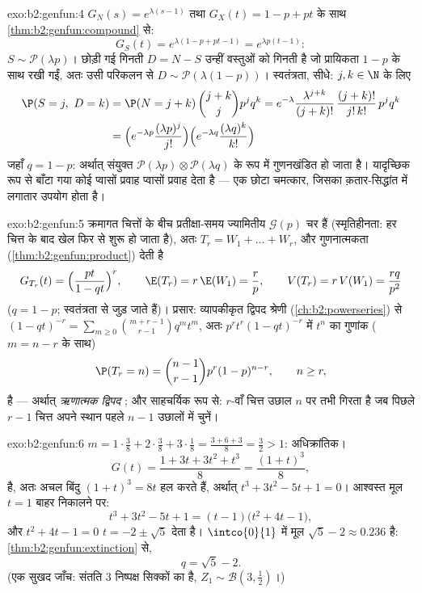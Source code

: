 \begin{solution}{exo:b2:genfun:4}
$G_N(s) = e^{\lambda(s-1)}$ तथा $G_X(t) = 1 - p + pt$ के साथ \cref{thm:b2:genfun:compound} से:
\[
G_S(t) = e^{\lambda(1 - p + pt - 1)} = e^{\lambda p(t - 1)} :
\]
$S \sim \mathcal{P}(\lambda p)$। छोड़ी गई गिनती $D = N - S$ उन्हीं वस्तुओं को गिनती है जो प्रायिकता $1 - p$
के साथ रखी गईं, अतः उसी परिकलन से $D \sim \mathcal{P}(\lambda(1 - p))$। स्वतंत्रता, सीधे: $j, k \in \N$ के
लिए
\begin{align*}
\P(S = j,\ D = k)
&= \P(N = j + k)\,\binom{j+k}{j}p^jq^k
= e^{-\lambda}\frac{\lambda^{j+k}}{(j+k)!}\,
\frac{(j+k)!}{j!\,k!}\,p^jq^k\\
&= \Bigl(e^{-\lambda p}\frac{(\lambda p)^j}{j!}\Bigr)
\Bigl(e^{-\lambda q}\frac{(\lambda q)^k}{k!}\Bigr)
\end{align*}
जहाँ $q = 1 - p$: अर्थात् संयुक्त  $\mathcal{P}(\lambda p) \otimes \mathcal{P}(\lambda q)$ के रूप में गुणनखंडित हो जाता
है। यादृच्छिक रूप से बाँटा गया कोई प्वासों प्रवाह \emph{}
प्वासों प्रवाह देता है --- एक छोटा चमत्कार, जिसका क़तार-सिद्धांत में
लगातार उपयोग होता है।
\end{solution}

\begin{solution}{exo:b2:genfun:5}
क्रमागत चित्तों के बीच प्रतीक्षा-समय  ज्यामितीय $\mathcal{G}(p)$ चर हैं
(स्मृतिहीनता: हर चित्त के बाद खेल फिर से शुरू हो जाता है), अतः $T_r = W_1 + \dots + W_r$,
और गुणनात्मकता (\cref{thm:b2:genfun:product}) देती है
\[
G_{T_r}(t) = \Bigl(\frac{pt}{1 - qt}\Bigr)^{r},
\qquad
\E(T_r) = r\,\E(W_1) = \frac rp,
\qquad
V(T_r) = r\,V(W_1) = \frac{rq}{p^2}
\]
($q = 1 - p$;  स्वतंत्रता से जुड़ जाते हैं)। प्रसार: व्यापकीकृत
द्विपद श्रेणी (\cref{ch:b2:powerseries}) से $(1 - qt)^{-r} = \sum_{m\geq0}
\binom{m + r - 1}{r - 1}q^mt^m$, अतः $p^rt^r(1 - qt)^{-r}$ में $t^n$ का गुणांक ($m = n - r$ के
साथ)
\[
\P(T_r = n) = \binom{n-1}{r-1}p^r(1-p)^{n-r},
\qquad n \geq r ,
\]
है --- अर्थात् \emph{ऋणात्मक द्विपद} ; और साहचर्यिक रूप से:
$r$-वाँ चित्त उछाल $n$ पर तभी गिरता है जब पिछले $r - 1$ चित्त अपने
स्थान पहले $n - 1$ उछालों में चुनें।
\end{solution}

\begin{solution}{exo:b2:genfun:6}
$m = 1\cdot\frac38 + 2\cdot\frac38 + 3\cdot\frac18 = \frac{3 + 6 +
3}{8} = \frac32 > 1$: अधिक्रांतिक। 
\[
G(t) = \frac{1 + 3t + 3t^2 + t^3}{8} = \frac{(1 + t)^3}{8} ,
\]
है, अतः अचल बिंदु $(1 + t)^3 = 8t$ हल करते हैं, अर्थात् $t^3 + 3t^2 - 5t + 1
= 0$। आश्वस्त मूल $t = 1$
बाहर निकालने पर:
\[
t^3 + 3t^2 - 5t + 1 = (t - 1)\bigl(t^2 + 4t - 1\bigr),
\]
और $t^2 + 4t - 1 = 0$ $t = -2 \pm \sqrt5$ देता है। $\intco{0}{1}$ में मूल $\sqrt5 - 2 \approx 0.236$ है: \cref{thm:b2:genfun:extinction} से,
\[
q = \sqrt 5 - 2 .
\]
(एक सुखद जाँच: संतति  $3$  निष्पक्ष सिक्कों का 
है, $Z_1 \sim \mathcal{B}(3, \frac12)$।)
\end{solution}

